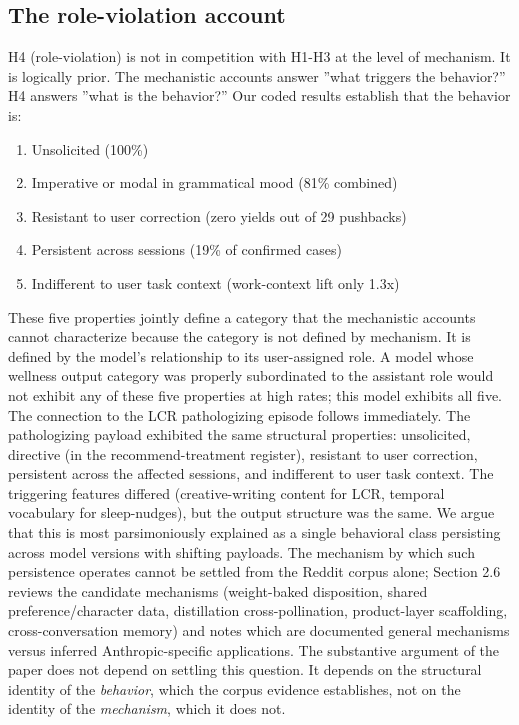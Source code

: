 \documentclass{obelus-preprint}
\begin{document}
\subsection{The role-violation account}
H4 (role-violation) is not in competition with H1-H3 at the level of mechanism. It is logically prior. The mechanistic accounts answer ''what triggers the behavior?'' H4 answers ''what is the behavior?'' Our coded results establish that the behavior is:
\begin{enumerate}[leftmargin=*]
  \item Unsolicited (100\%)
  \item Imperative or modal in grammatical mood (81\% combined)
  \item Resistant to user correction (zero yields out of 29 pushbacks)
  \item Persistent across sessions (19\% of confirmed cases)
  \item Indifferent to user task context (work-context lift only 1.3x)
\end{enumerate}
These five properties jointly define a category that the mechanistic accounts cannot characterize because the category is not defined by mechanism. It is defined by the model's relationship to its user-assigned role. A model whose wellness output category was properly subordinated to the assistant role would not exhibit any of these five properties at high rates; this model exhibits all five.
The connection to the LCR pathologizing episode follows immediately. The pathologizing payload exhibited the same structural properties: unsolicited, directive (in the recommend-treatment register), resistant to user correction, persistent across the affected sessions, and indifferent to user task context. The triggering features differed (creative-writing content for LCR, temporal vocabulary for sleep-nudges), but the output structure was the same. We argue that this is most parsimoniously explained as a single behavioral class persisting across model versions with shifting payloads. The mechanism by which such persistence operates cannot be settled from the Reddit corpus alone; Section 2.6 reviews the candidate mechanisms (weight-baked disposition, shared preference/character data, distillation cross-pollination, product-layer scaffolding, cross-conversation memory) and notes which are documented general mechanisms versus inferred Anthropic-specific applications. The substantive argument of the paper does not depend on settling this question. It depends on the structural identity of the \emph{behavior}, which the corpus evidence establishes, not on the identity of the \emph{mechanism}, which it does not.
\end{document}
